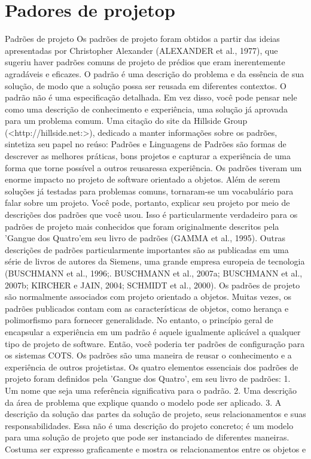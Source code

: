 \section{Padores de projetop}

Padrões de projeto
Os padrões de projeto foram obtidos a partir das ideias apresentadas por Christopher Alexander (ALEXANDER
et al., 1977), que sugeriu haver padrões comuns de projeto de prédios que eram inerentemente agradáveis e
eficazes. O padrão é uma descrição do problema e da essência de sua solução, de modo que a solução possa ser
reusada em diferentes contextos. O padrão não é uma especificação detalhada. Em vez disso, você pode pensar
nele como uma descrição de conhecimento e experiência, uma solução já aprovada para um problema comum.
Uma citação do site da Hillside Group (<http://hillside.net:>), dedicado a manter informações sobre os padrões,
sintetiza seu papel no reúso:
Padrões e Linguagens de Padrões são formas de descrever as melhores práticas, bons projetos e capturar a experiência
de uma forma que torne possível a outros reusaressa experiência.
Os padrões tiveram um enorme impacto no projeto de software orientado a objetos. Além de serem soluções
já testadas para problemas comuns, tornaram-se um vocabulário para falar sobre um projeto. Você pode, portanto,
explicar seu projeto por meio de descrições dos padrões que você usou. Isso é particularmente verdadeiro para os
padrões de projeto mais conhecidos que foram originalmente descritos pela 'Gangue dos Quatro'em seu livro de
padrões (GAMMA et al., 1995). Outras descrições de padrões particularmente importantes são as publicadas em
uma série de livros de autores da Siemens, uma grande empresa europeia de tecnologia (BUSCHMANN et al., 1996;.
BUSCHMANN et al., 2007a; BUSCHMANN et al., 2007b; KIRCHER e JAIN, 2004; SCHMIDT et al., 2000).
Os padrões de projeto são normalmente associados com projeto orientado a objetos. Muitas vezes, os padrões
publicados contam com as características de objetos, como herança e polimorfismo para fornecer generalidade.
No entanto, o princípio geral de encapsular a experiência em um padrão é aquele igualmente aplicável a qualquer
tipo de projeto de software. Então, você poderia ter padrões de configuração para os sistemas COTS. Os padrões
são uma maneira de reusar o conhecimento e a experiência de outros projetistas.
Os quatro elementos essenciais dos padrões de projeto foram definidos pela 'Gangue dos Quatro', em seu livro
de padrões:
1. Um nome que seja uma referência significativa para o padrão.
2. Uma descrição da área de problema que explique quando o modelo pode ser aplicado.
3. A descrição da solução das partes da solução de projeto, seus relacionamentos e suas responsabilidades. Essa
não é uma descrição do projeto concreto; é um modelo para uma solução de projeto que pode ser instanciado
de diferentes maneiras. Costuma ser expresso graficamente e mostra os relacionamentos entre os objetos e